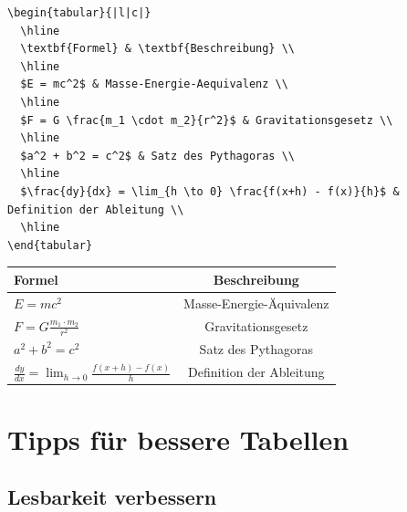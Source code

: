 \documentclass[12pt,a4paper]{article}
\begin{document}
\begin{lstlisting}[style=latex]
\begin{tabular}{|l|c|}
  \hline
  \textbf{Formel} & \textbf{Beschreibung} \\
  \hline
  $E = mc^2$ & Masse-Energie-Aequivalenz \\
  \hline
  $F = G \frac{m_1 \cdot m_2}{r^2}$ & Gravitationsgesetz \\
  \hline
  $a^2 + b^2 = c^2$ & Satz des Pythagoras \\
  \hline
  $\frac{dy}{dx} = \lim_{h \to 0} \frac{f(x+h) - f(x)}{h}$ & Definition der Ableitung \\
  \hline
\end{tabular}
\end{lstlisting}

\begin{ausgabe}
\begin{center}
\begin{tabular}{|l|c|}
  \hline
  \textbf{Formel} & \textbf{Beschreibung} \\
  \hline
  $E = mc^2$ & Masse-Energie-Äquivalenz \\
  \hline
  $F = G \frac{m_1 \cdot m_2}{r^2}$ & Gravitationsgesetz \\
  \hline
  $a^2 + b^2 = c^2$ & Satz des Pythagoras \\
  \hline
  $\frac{dy}{dx} = \lim_{h \to 0} \frac{f(x+h) - f(x)}{h}$ & Definition der Ableitung \\
  \hline
\end{tabular}
\end{center}
\end{ausgabe}

\section{Tipps für bessere Tabellen}

\subsection{Lesbarkeit verbessern}
\end{document}
